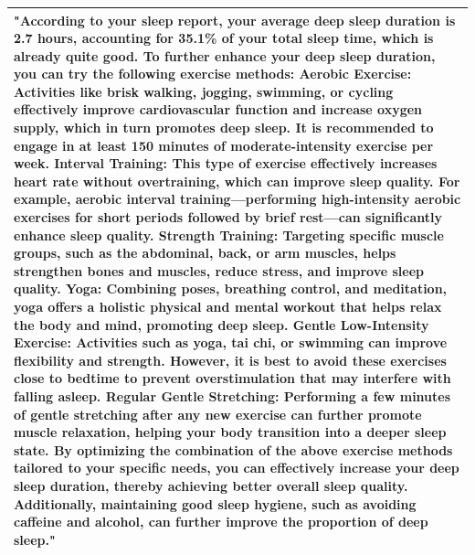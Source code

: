 \documentclass[preprint,12pt]{elsarticle}
\begin{document}
\begin{table}[!t]
\begin{tabular}{@{}p{}@{}}
"According to your sleep report, your average deep sleep duration is 2.7 hours, accounting for 35.1\% of your total sleep time, which is already quite good. To further enhance your deep sleep duration, you can try the following exercise methods: Aerobic Exercise: Activities like brisk walking, jogging, swimming, or cycling effectively improve cardiovascular function and increase oxygen supply, which in turn promotes deep sleep. It is recommended to engage in at least 150 minutes of moderate-intensity exercise per week. Interval Training: This type of exercise effectively increases heart rate without overtraining, which can improve sleep quality. For example, aerobic interval training—performing high-intensity aerobic exercises for short periods followed by brief rest—can significantly enhance sleep quality. Strength Training: Targeting specific muscle groups, such as the abdominal, back, or arm muscles, helps strengthen bones and muscles, reduce stress, and improve sleep quality. Yoga: Combining poses, breathing control, and meditation, yoga offers a holistic physical and mental workout that helps relax the body and mind, promoting deep sleep. Gentle Low-Intensity Exercise: Activities such as yoga, tai chi, or swimming can improve flexibility and strength. However, it is best to avoid these exercises close to bedtime to prevent overstimulation that may interfere with falling asleep. Regular Gentle Stretching: Performing a few minutes of gentle stretching after any new exercise can further promote muscle relaxation, helping your body transition into a deeper sleep state. By optimizing the combination of the above exercise methods tailored to your specific needs, you can effectively increase your deep sleep duration, thereby achieving better overall sleep quality. Additionally, maintaining good sleep hygiene, such as avoiding caffeine and alcohol, can further improve the proportion of deep sleep." \\
\bottomrule
\end{tabular}
\end{table}
\end{document}
